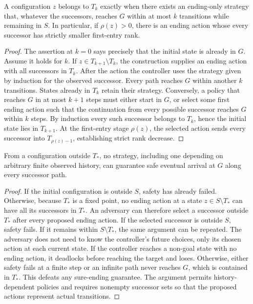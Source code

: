 \begin{Corelemma}\label{Core:r:end-horizon}
A configuration $z$ belongs to $T_k$ exactly when there exists an ending-only strategy that, whatever the successors, reaches $G$ within at most $k$ transitions while remaining in $S$. In particular, if $\rho(z)>0$, there is an ending action whose every successor has strictly smaller first-entry rank.
\end{Corelemma}
\begin{proof}
The assertion at $k=0$ says precisely that the initial state is already in $G$. Assume it holds for $k$. If $z\in T_{k+1}\setminus T_k$, the construction supplies an ending action with all successors in $T_k$. After the action the controller uses the strategy given by induction for the observed successor. Every path reaches $G$ within another $k$ transitions. States already in $T_k$ retain their strategy. Conversely, a policy that reaches $G$ in at most $k+1$ steps must either start in $G$, or select some first ending action such that the continuation from every possible successor reaches $G$ within $k$ steps. By induction every such successor belongs to $T_k$, hence the initial state lies in $T_{k+1}$. At the first-entry stage $\rho(z)$, the selected action sends every successor into $T_{\rho(z)-1}$, establishing strict rank decrease.
\end{proof}

\begin{Corelemma}\label{Core:r:ending-complete}
From a configuration outside $T_*$, no strategy, including one depending on arbitrary finite observed history, can guarantee safe eventual arrival at $G$ along every successor path.
\end{Corelemma}
\begin{proof}
If the initial configuration is outside $S$, safety has already failed. Otherwise, because $T_*$ is a fixed point, no ending action at a state $z\in S\setminus T_*$ can have all its successors in $T_*$. An adversary can therefore select a successor outside $T_*$ after every proposed ending action. If the selected successor is outside $S$, safety fails. If it remains within $S\setminus T_*$, the same argument can be repeated. The adversary does not need to know the controller's future choices, only its chosen action at each current state. If the controller reaches a non-goal state with no ending action, it deadlocks before reaching the target and loses. Otherwise, either safety fails at a finite step or an infinite path never reaches $G$, which is contained in $T_*$. This defeats any sure-ending guarantee. The argument permits history-dependent policies and requires nonempty successor sets so that the proposed actions represent actual transitions.
\end{proof}

